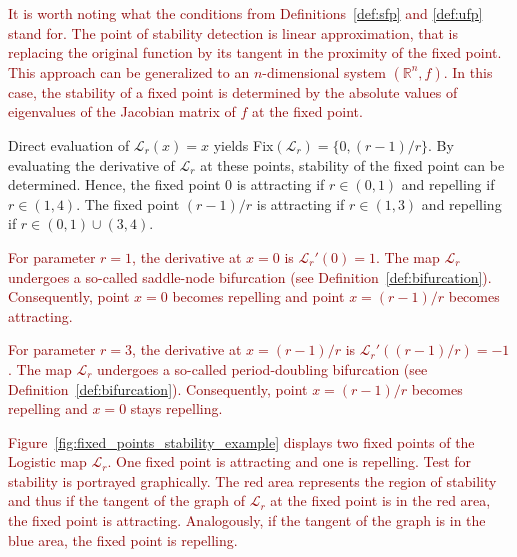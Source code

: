 \begin{remark}
    \textcolor{darkred}{
        It is worth noting what the conditions from Definitions~\ref{def:sfp} and \ref{def:ufp} stand for.
        The point of stability detection is linear approximation, that is replacing the original function by its tangent in the proximity of the fixed point.
        This approach can be generalized to an $n$-dimensional system $\left( \mathbb{R}^{n}, f \right)$.
        In this case, the stability of a fixed point is determined by the absolute values of eigenvalues of the Jacobian matrix of $f$ at the fixed point.
    }
    \par
    Direct evaluation of $\mathcal{L}_{r}(x)=x$ yields Fix$(\mathcal{L}_{r}) = \{ 0, (r-1)/r \}$.
    By evaluating the derivative of $\mathcal{L}_{r}$ at these points, stability of the fixed point can be determined.
    Hence, the fixed point $0$ is attracting if $r \in (0, 1)$ and repelling if $r \in (1, 4)$.
    The fixed point $(r-1)/r$ is attracting if $r \in (1, 3)$ and repelling if $r \in (0, 1) \cup (3, 4) $.
    \par
    \textcolor{darkred}{
    For parameter $r = 1$, the derivative at $x=0$ is $\mathcal{L}_{r}'(0)=1$.
    The map $\mathcal{L}_{r}$ undergoes a so-called saddle-node bifurcation (see Definition~\ref{def:bifurcation}).
    Consequently, point $x=0$ becomes repelling and point $x=(r-1)/r$ becomes attracting.
    }
    \par
    \textcolor{darkred}{
    For parameter $r = 3$, the derivative at $x=(r-1)/r$ is $\mathcal{L}_{r}'((r-1)/r)=-1$.
    The map $\mathcal{L}_{r}$ undergoes a so-called period-doubling bifurcation (see Definition~\ref{def:bifurcation}).
    Consequently, point $x=(r-1)/r$ becomes repelling and $x=0$ stays repelling.
    }
    \par
    \textcolor{darkred}{
    Figure~\ref{fig:fixed_points_stability_example} displays two fixed points of the Logistic map $\mathcal{L}_{r}$.
    One fixed point is attracting and one is repelling.
    Test for stability is portrayed graphically.
    The red area represents the region of stability and thus if the tangent of the graph of $\mathcal{L}_{r}$ at the fixed point is in the red area, the fixed point is attracting.
    Analogously, if the tangent of the graph is in the blue area, the fixed point is repelling.
    }
\end{remark}

